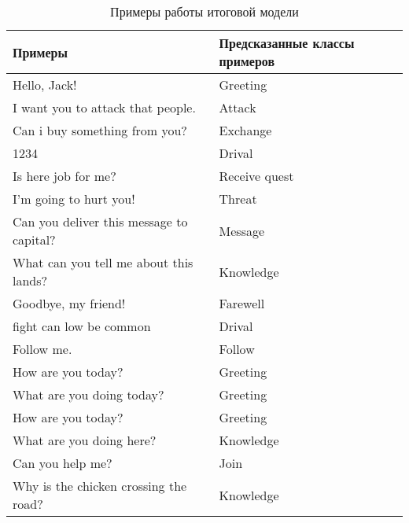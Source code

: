 \begin{table}[H]
   \captionsetup{format=hang, singlelinecheck=false}
   \raggedleft
      \caption{Примеры работы итоговой модели}
      \label{test-examples:table}
   \centering        
   \begin{tabular}{|p{8cm}|p{8cm}|}
      \hline
      Примеры & Предсказанные классы примеров \\
      \hline
      Hello, Jack! & Greeting \\
      \hline
      I want you to attack that people. & Attack \\
      \hline
      Can i buy something from you? & Exchange \\
      \hline
      1234 & Drival \\
      \hline
      Is here job for me? & Receive quest \\
      \hline
      I'm going to hurt you! & Threat \\
      \hline
      Can you deliver this message to capital? & Message \\
      \hline
      What can you tell me about this lands? & Knowledge \\
      \hline
      Goodbye, my friend! & Farewell \\
      \hline
      fight can low be common & Drival \\
      \hline
      Follow me. & Follow \\
      \hline
      How are you today? & Greeting \\
      \hline
      What are you doing today? & Greeting \\
      \hline
      How are you today? & Greeting \\
      \hline
      What are you doing here? & Knowledge \\
      \hline
      Can you help me? & Join \\
      \hline
      Why is the chicken crossing the road? & Knowledge \\
      \hline
   \end{tabular}
\end{table}
